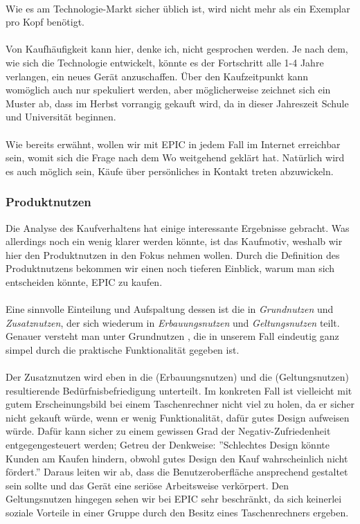 \\
Wie es am Technologie-Markt sicher üblich ist, wird nicht mehr als ein Exemplar pro Kopf benötigt.\\
\\
Von Kaufhäufigkeit kann hier, denke ich, nicht gesprochen werden. Je nach dem, wie sich die Technologie entwickelt, könnte es der Fortschritt alle 1-4 Jahre verlangen, ein neues Gerät anzuschaffen. Über den Kaufzeitpunkt kann womöglich auch nur spekuliert werden, aber möglicherweise zeichnet sich ein Muster ab, dass im Herbst vorrangig gekauft wird, da in dieser Jahreszeit Schule und Universität beginnen.\\
\\
Wie bereits erwähnt, wollen wir mit EPIC in jedem Fall im Internet erreichbar sein, womit sich die Frage nach dem Wo weitgehend geklärt hat. Natürlich wird es auch möglich sein, Käufe über persönliches in Kontakt treten abzuwickeln.\\

\subsubsection{Produktnutzen}
Die Analyse des Kaufverhaltens hat einige interessante Ergebnisse gebracht. Was allerdings noch ein wenig klarer werden könnte, ist das Kaufmotiv, weshalb wir hier den Produktnutzen in den Fokus nehmen wollen. Durch die Definition des Produktnutzens bekommen wir einen noch tieferen Einblick, warum man sich entscheiden könnte, EPIC zu kaufen.\\
\\
Eine sinnvolle Einteilung und Aufspaltung dessen ist die in \textit{Grundnutzen} und \textit{Zusatznutzen}, der sich wiederum in \textit{Erbauungsnutzen} und \textit{Geltungsnutzen} teilt. Genauer versteht man unter Grundnutzen , die in unserem Fall eindeutig ganz simpel durch die praktische Funktionalität gegeben ist.\\
\\
Der Zusatznutzen wird eben in die  (Erbauungsnutzen) und die  (Geltungsnutzen) resultierende Bedürfnisbefriedigung unterteilt. Im konkreten Fall ist vielleicht mit gutem Erscheinungsbild bei einem Taschenrechner nicht viel zu holen, da er sicher nicht gekauft würde, wenn er wenig Funktionalität, dafür gutes Design aufweisen würde. Dafür kann sicher zu einem gewissen Grad der Negativ-Zufriedenheit entgegengesteuert werden; Getreu der Denkweise: ''Schlechtes Design könnte Kunden am Kaufen hindern, obwohl gutes Design den Kauf wahrscheinlich nicht fördert.'' Daraus leiten wir ab, dass die Benutzeroberfläche ansprechend gestaltet sein sollte und das Gerät eine seriöse Arbeitsweise verkörpert. Den Geltungsnutzen hingegen sehen wir bei EPIC sehr beschränkt, da sich keinerlei soziale Vorteile in einer Gruppe durch den Besitz eines Taschenrechners ergeben.\\

